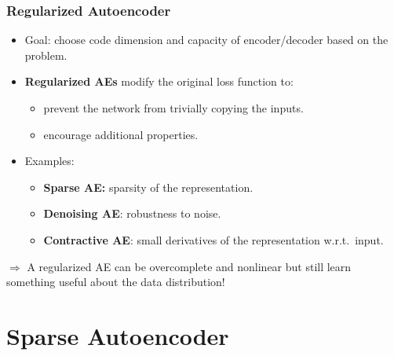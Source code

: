 \documentclass[11pt,compress,t,notes=noshow]{beamer}
\begin{document}
    

  \begin{frame}

  \frametitle{Regularized Autoencoder}
  
 
    \begin{itemize}
       \item Goal: choose code dimension and capacity of encoder/decoder based on the problem.
       \item \textbf{Regularized AEs} modify the original loss function to:
       \begin{itemize}
       \item prevent the network from trivially copying the inputs.
       \item encourage additional properties.
       \end{itemize}
       
     
        \item Examples:
            \begin{itemize}
                \item \textbf{Sparse AE:} sparsity of the representation.
                \item \textbf{Denoising AE}: robustness to noise.%
                \item \textbf{Contractive AE}: small derivatives of the representation w.r.t.~input.
            \end{itemize}
   
    \end{itemize} 
    $\Rightarrow$ 
    A regularized AE can be overcomplete and nonlinear but still learn something useful about the data distribution!  
  
  
\end{frame}


\section{Sparse Autoencoder}
\end{document}
